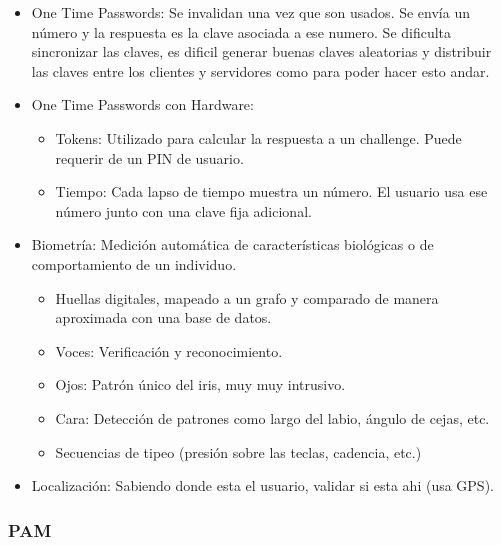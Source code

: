 \begin{itemize}
\begin{itemize}
		\item One Time Passwords: Se invalidan una vez que son usados. Se envía un número y la respuesta es la clave
		asociada a ese numero. Se dificulta sincronizar las claves, es dificil generar buenas claves aleatorias y
		distribuir las claves entre los clientes y servidores como para poder hacer esto andar.
		\item One Time Passwords con Hardware: \begin{itemize}
			\item Tokens: Utilizado para calcular la respuesta a un challenge. Puede requerir de un PIN de usuario.
			\item Tiempo: Cada lapso de tiempo muestra un número. El usuario usa ese número junto con una clave fija
			adicional.
		\end{itemize}
		\item Biometría: Medición automática de características biológicas o de comportamiento de un individuo.
		\begin{itemize}
			\item Huellas digitales, mapeado a un grafo y comparado de manera aproximada con una base de datos.
			\item Voces: Verificación y reconocimiento.
			\item Ojos: Patrón único del iris, muy muy intrusivo.
			\item Cara: Detección de patrones como largo del labio, ángulo de cejas, etc.
			\item Secuencias de tipeo (presión sobre las teclas, cadencia, etc.)
		\end{itemize}
		\item Localización: Sabiendo donde esta el usuario, validar si esta ahi (usa GPS).
	\end{itemize}
\end{itemize}

\subsubsection{PAM}

